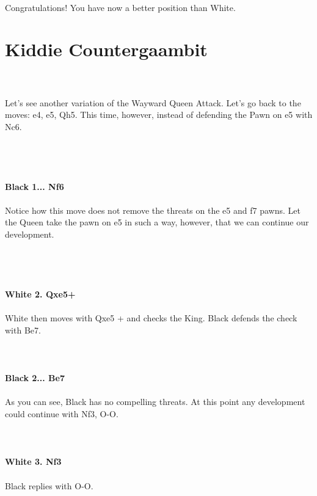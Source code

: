 \documentclass{article}
\begin{document}
\\
Congratulations! You have now a better position than White.\section{ Kiddie Countergaambit}

\\
\\
Let's see another variation of the Wayward Queen Attack. Let's go back to the moves: e4, e5, Qh5. This time, however, instead of defending the Pawn on e5 with Nc6.\\\\
\\

\\
\\
\textbf{Black 1... Nf6}\\
\\
Notice how this move does not remove the threats on the e5 and f7 pawns. Let the Queen take the pawn on e5 in such a way, however, that we can continue our development.\\\\
\\

\\
\\
\textbf{White 2. Qxe5+}\\
\\
White then moves with Qxe5 + and checks the King. Black defends the check with Be7.\\
\\

\\
\\
\textbf{Black 2... Be7}\\
\\
As you can see, Black has no compelling threats. At this point any development could continue with Nf3, O-O.\\
\\

\\
\\
\textbf{White 3. Nf3}\\
\\
Black replies with O-O.\\
\\

\end{document}
